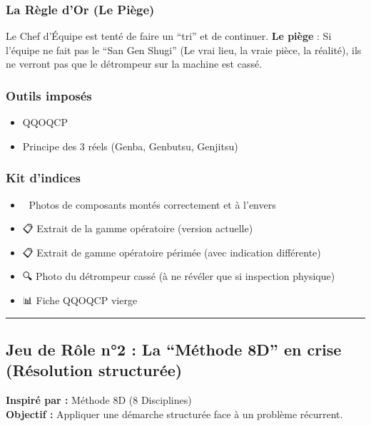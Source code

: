 \documentclass[
]{article}
\providecommand{\tightlist}{%
  \setlength{\itemsep}{0pt}\setlength{\parskip}{0pt}}
\begin{document}
\subsubsection{La Règle d'Or (Le
Piège)}\label{la-ruxe8gle-dor-le-piuxe8ge}

Le Chef d'Équipe est tenté de faire un ``tri'' et de continuer.
\textbf{Le piège} : Si l'équipe ne fait pas le ``San Gen Shugi'' (Le
vrai lieu, la vraie pièce, la réalité), ils ne verront pas que le
détrompeur sur la machine est cassé.

\subsubsection{Outils imposés}\label{outils-imposuxe9s}

\begin{itemize}
\tightlist
\item
  QQOQCP
\item
  Principe des 3 réels (Genba, Genbutsu, Genjitsu)
\end{itemize}

\subsubsection{Kit d'indices}\label{kit-dindices}

\begin{itemize}
\tightlist
\item
  📸 Photos de composants montés correctement et à l'envers
\item
  📋 Extrait de la gamme opératoire (version actuelle)
\item
  📋 Extrait de gamme opératoire périmée (avec indication différente)
\item
  🔍 Photo du détrompeur cassé (à ne révéler que si inspection physique)
\item
  📊 Fiche QQOQCP vierge
\end{itemize}

\begin{center}\rule{0.5\linewidth}{0.5pt}\end{center}

\subsection{Jeu de Rôle n°2 : La ``Méthode 8D'' en crise (Résolution
structurée)}\label{jeu-de-ruxf4le-n2-la-muxe9thode-8d-en-crise-ruxe9solution-structuruxe9e}

\textbf{Inspiré par :} Méthode 8D (8 Disciplines)\\
\textbf{Objectif :} Appliquer une démarche structurée face à un problème
récurrent.
\end{document}
